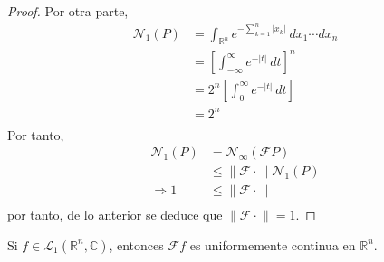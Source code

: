\documentclass[12pt]{report}
\theoremstyle{largebreak}
\renewcommand{\leq}{\ensuremath{\leqslant}}
\newcommand\abs[1]{\ensuremath{\left|#1\right|}}
\newcommand\norm[1]{\ensuremath{\|#1\|}}
\newcommand{\N}[2]{\ensuremath{\mathcal{N}_{#1}\left(#2\right)}}
\newcommand{\fou}[1]{\ensuremath{\mathcal{F}#1}}
\begin{document}
\begin{proof}
        Por otra parte,
        \begin{equation*}
            \begin{split}
                \N{1}{P}&=\int_{\mathbb{R}^n}e^{ -\sum_{ k=1}^n\abs{x_k}}\:dx_1\cdots dx_n\\
                &=\left[\int_{-\infty}^\infty e^{-\abs{t}}\:dt \right]^n\\
                &=2^n\left[\int_0^{\infty}e^{-\abs{t}}\:dt \right]\\
                &=2^n\\
            \end{split}
        \end{equation*}
        Por tanto,
        \begin{equation*}
            \begin{split}
                \N{1}{P}&=\N{\infty}{\fou{P}}\\
                &\leq\norm{\fou{\cdot}}\N{1}{P}\\
                \Rightarrow 1&\leq\norm{\fou{\cdot}}\\
            \end{split}
        \end{equation*}
        por tanto, de lo anterior se deduce que $\norm{\fou{\cdot}}=1$. 
    \end{proof}

    \begin{propo}
        Si $f\in\mathcal{L}_1(\mathbb{R}^n,\mathbb{C})$, entonces $\fou{f}$ es uniformemente continua en $\mathbb{R}^n$.
    \end{propo}
\end{document}
